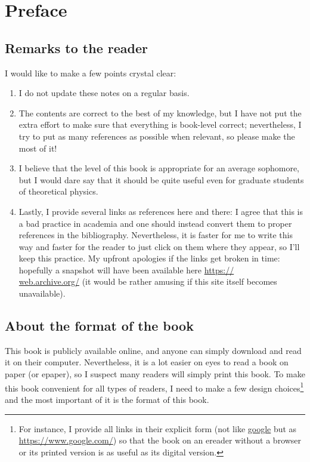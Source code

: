 \chapter{Preface}
\sidebar{\vspace*{\baselineskip}}
\section{Remarks to the reader}
I would like to make a few points crystal clear:
\begin{enumerate}
	\item I do not update these notes on a regular basis.
	\item The contents are correct to the best of my knowledge, but I have not put the extra effort to make sure that everything is book-level correct; nevertheless, I try to put as many references as possible when relevant, so please make the most of it!
	\item I believe that the level of this book is appropriate for an average sophomore, but I would dare say that it should be quite useful even for graduate students of theoretical physics. 
	\item Lastly, I provide several links as references here and there: I agree that this is a bad practice in academia and one should instead convert them to proper references in the bibliography. Nevertheless, it is faster for me to write this way and faster for the reader to just click on them where they appear, so I'll keep this practice. My upfront apologies if the links get broken in time: hopefully a snapshot will have been available here \href{https://web.archive.org/}{https://\\web.archive.org/} (it would be rather amusing if this site itself becomes unavailable).
\end{enumerate}
\section{About the format of the book}
This book is publicly available online, and anyone can simply download and read it on their computer. Nevertheless, it is a lot easier on eyes to read a book on paper (or epaper), so I suspect many readers will simply print this book. To make this book convenient for all types of readers, I need to make a few design choices\footnote{For instance, I provide all links in their explicit form (not like \href{https://www.google.com/}{google} but as \href{https://www.google.com/}{https://www.google.com/}) so that the book on an ereader without a browser or its printed version is as useful as its digital version.} and the most important of it is the format of this book.

